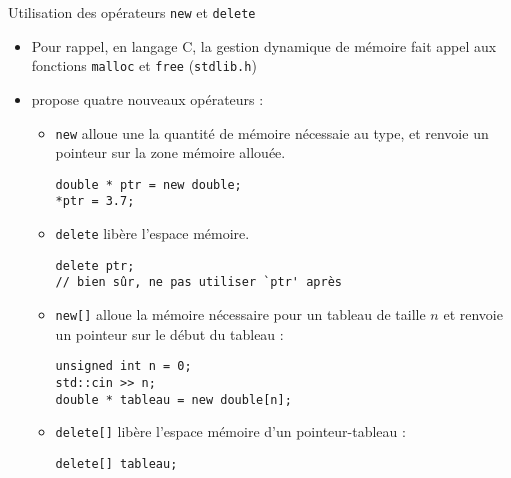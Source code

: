 \documentclass[c]{beamer}
\newcommand{\inline}[1]{\texttt{#1}}
\begin{document}
\begin{frame}[fragile]{Utilisation des opérateurs \texttt{new} et \texttt{delete}}
 \begin{itemize}
\item Pour rappel, en langage C, la gestion dynamique de mémoire fait appel aux
fonctions \texttt{malloc} et \texttt{free} (\texttt{stdlib.h})

\item \Cpp propose quatre nouveaux opérateurs :

\begin{itemize}
\item \inline{new} alloue une la quantité de mémoire nécessaie au type, et renvoie un pointeur sur la zone mémoire allouée.
\begin{verbatim}
double * ptr = new double;
*ptr = 3.7;
\end{verbatim}

\item \inline{delete} libère l'espace mémoire.
\begin{verbatim}
delete ptr;
// bien sûr, ne pas utiliser `ptr' après
\end{verbatim}

\item \inline{new[]} alloue la mémoire nécessaire pour un tableau de taille $n$ et renvoie un pointeur sur le début du tableau :
\begin{verbatim}
unsigned int n = 0;
std::cin >> n;
double * tableau = new double[n];
\end{verbatim}

\item \inline{delete[]} libère l'espace mémoire d'un pointeur-tableau :
\begin{verbatim}
delete[] tableau;
\end{verbatim}
\end{itemize}
\end{itemize}
\end{frame}


\end{document}
